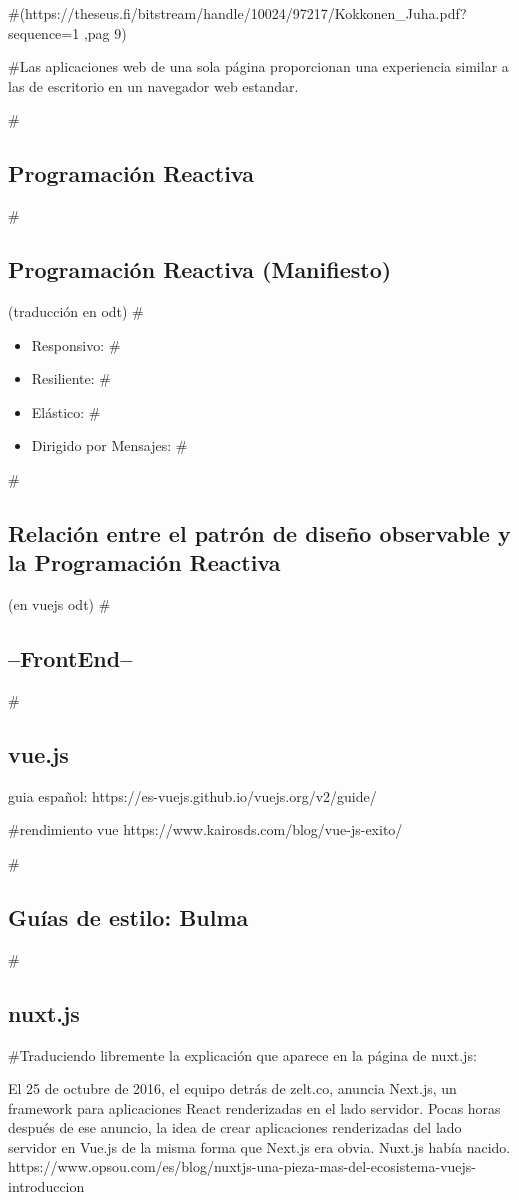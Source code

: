 #(https://theseus.fi/bitstream/handle/10024/97217/Kokkonen_Juha.pdf?sequence=1 ,pag 9)

#Las aplicaciones web de una sola página proporcionan una experiencia similar a las de escritorio en un navegador web estandar. 

#\subsection{Programación Reactiva}
#\subsection{Programación Reactiva (Manifiesto)}
(traducción en odt)
#\begin{itemize}
#\item Responsivo:
#\item Resiliente:
#\item Elástico:
#\item Dirigido por Mensajes:
#\end{itemize}
#\subsection{Relación entre el patrón de diseño observable y la Programación Reactiva}
(en vuejs odt)
#\subsection{--FrontEnd--}
#\subsection{vue.js}
guia español: https://es-vuejs.github.io/vuejs.org/v2/guide/

#rendimiento vue
https://www.kairosds.com/blog/vue-js-exito/

#\subsection{Guías de estilo: Bulma}
#\subsection{nuxt.js}

#Traduciendo libremente la explicación que aparece en la página de nuxt.js:

    El 25 de octubre de 2016, el equipo detrás de zelt.co, anuncia Next.js, un framework para aplicaciones React renderizadas en el lado servidor. Pocas horas después de ese anuncio, la idea de crear aplicaciones renderizadas del lado servidor en Vue.js de la misma forma que Next.js era obvia. Nuxt.js había nacido.
https://www.opsou.com/es/blog/nuxtjs-una-pieza-mas-del-ecosistema-vuejs-introduccion


